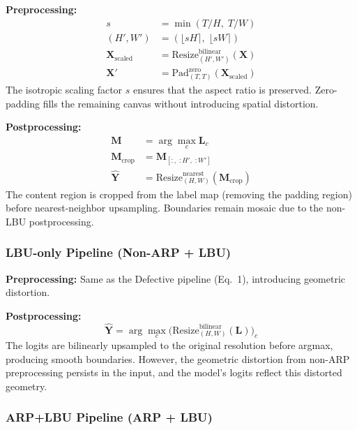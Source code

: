 \documentclass[10pt,twocolumn]{article}
\begin{document}
\textbf{Preprocessing:}
\begin{align}
    s &= \min(T/H,\; T/W) \label{eq:arp_scale} \\
    (H', W') &= (\lfloor sH \rceil,\; \lfloor sW \rceil) \label{eq:arp_newsize} \\
    \mathbf{X}_{\text{scaled}} &= \text{Resize}_{(H',W')}^{\text{bilinear}}(\mathbf{X}) \label{eq:arp_resize} \\
    \mathbf{X}' &= \text{Pad}_{(T,T)}^{\text{zero}}(\mathbf{X}_{\text{scaled}}) \label{eq:arp_pad}
\end{align}
The isotropic scaling factor $s$ ensures that the aspect ratio is preserved. Zero-padding fills the remaining canvas without introducing spatial distortion.

\textbf{Postprocessing:}
\begin{align}
    \mathbf{M} &= \arg\max_c \mathbf{L}_c \label{eq:arp_argmax} \\
    \mathbf{M}_{\text{crop}} &= \mathbf{M}_{[:,\; :H',\; :W']} \label{eq:arp_crop} \\
    \hat{\mathbf{Y}} &= \text{Resize}_{(H,W)}^{\text{nearest}}(\mathbf{M}_{\text{crop}}) \label{eq:arp_upsample}
\end{align}
The content region is cropped from the label map (removing the padding region) before nearest-neighbor upsampling. Boundaries remain mosaic due to the non-LBU postprocessing.

\subsubsection{LBU-only Pipeline (Non-ARP + LBU)}

\textbf{Preprocessing:}
Same as the Defective pipeline (Eq.~1), introducing geometric distortion.

\textbf{Postprocessing:}
\begin{equation}
    \hat{\mathbf{Y}} = \arg\max_c \Big(\text{Resize}_{(H,W)}^{\text{bilinear}}(\mathbf{L})\Big)_c
\end{equation}
The logits are bilinearly upsampled to the original resolution before argmax, producing smooth boundaries. However, the geometric distortion from non-ARP preprocessing persists in the input, and the model's logits reflect this distorted geometry.

\subsubsection{ARP+LBU Pipeline (ARP + LBU)}
\end{document}
